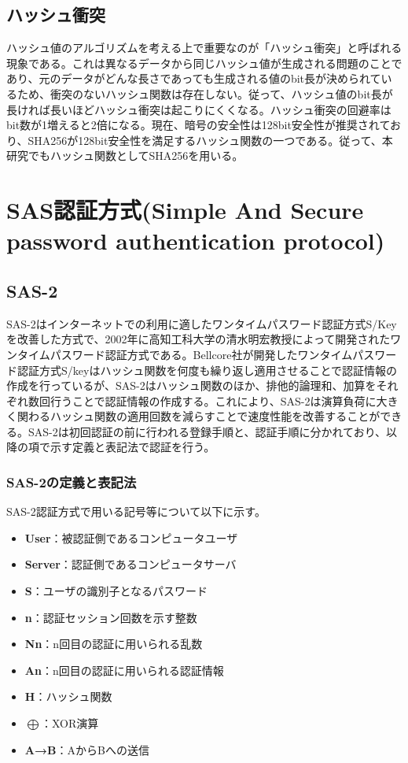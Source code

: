 \documentclass{thesis}
\begin{document}
\section{ハッシュ衝突}
ハッシュ値のアルゴリズムを考える上で重要なのが「ハッシュ衝突」と呼ばれる現象である。これは異なるデータから同じハッシュ値が生成される問題のことであり、元のデータがどんな長さであっても生成される値のbit長が決められているため、衝突のないハッシュ関数は存在しない。従って、ハッシュ値のbit長が長ければ長いほどハッシュ衝突は起こりにくくなる。ハッシュ衝突の回避率はbit数が1増えると2倍になる。現在、暗号の安全性は128bit安全性が推奨されており、SHA256が128bit安全性を満足するハッシュ関数の一つである。従って、本研究でもハッシュ関数としてSHA256を用いる。

\chapter{SAS認証方式(Simple And Secure password authentication protocol)}

\section{SAS-2}
SAS-2\cite{seven}はインターネットでの利用に適したワンタイムパスワード認証方式S/Keyを改善した方式で、2002年に高知工科大学の清水明宏教授によって開発されたワンタイムパスワード認証方式である。Bellcore社が開発したワンタイムパスワード認証方式S/keyはハッシュ関数を何度も繰り返し適用させることで認証情報の作成を行っているが、SAS-2はハッシュ関数のほか、排他的論理和、加算をそれぞれ数回行うことで認証情報の作成する。これにより、SAS-2は演算負荷に大きく関わるハッシュ関数の適用回数を減らすことで速度性能を改善することができる。SAS-2は初回認証の前に行われる登録手順と、認証手順に分かれており、以降の項で示す定義と表記法で認証を行う。

\subsection{SAS-2の定義と表記法}
SAS-2認証方式で用いる記号等について以下に示す。

\begin{itemize}
\item \textbf{User}：被認証側であるコンピュータユーザ
\item \textbf{Server}：認証側であるコンピュータサーバ
\item \textbf{S}：ユーザの識別子となるパスワード
\item \textbf{n}：認証セッション回数を示す整数
\item \textbf{Nn}：n回目の認証に用いられる乱数
\item \textbf{An}：n回目の認証に用いられる認証情報
\item \textbf{H}：ハッシュ関数
\item \textbf{$\bigoplus$}：XOR演算
\item \textbf{A→B}：AからBへの送信
\end{itemize}
\end{document}
